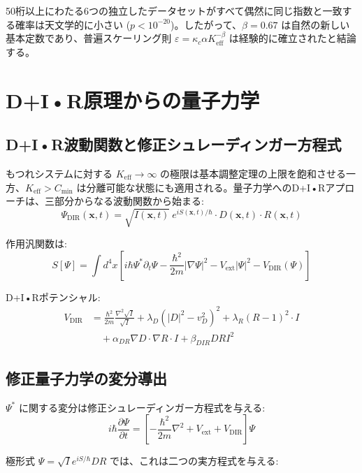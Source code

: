 \documentclass[11pt,a4paper]{article}
\begin{document}
	50桁以上にわたる6つの独立したデータセットがすべて偶然に同じ指数と一致する確率は天文学的に小さい ($p < 10^{-20}$)。したがって、$\beta = 0.67$ は自然の新しい基本定数であり、普遍スケーリング則 $\varepsilon = \kappa_c \alpha K_{\mathrm{eff}}^{-\beta}$ は経験的に確立されたと結論する。
	
	\section{D+I•R原理からの量子力学}
	\subsection{D+I•R波動関数と修正シュレーディンガー方程式}
	もつれシステムに対する $K_{\mathrm{eff}} \to \infty$ の極限は基本調整定理の上限を飽和させる一方、$K_{\mathrm{eff}} > C_{\min}$ は分離可能な状態にも適用される。量子力学へのD+I•Rアプローチは、三部分からなる波動関数から始まる:
	\begin{equation}
		\Psi_{\text{DIR}}(\mathbf{x},t) = \sqrt{I(\mathbf{x},t)} \ e^{iS(\mathbf{x},t)/\hbar} \cdot D(\mathbf{x},t) \cdot R(\mathbf{x},t)
	\end{equation}
	
	作用汎関数は:
	\begin{equation}
		S[\Psi] = \int d^4x \left[ i\hbar \Psi^* \partial_t \Psi - \frac{\hbar^2}{2m} |\nabla \Psi|^2 - V_{\text{ext}} |\Psi|^2 - V_{\text{DIR}}(\Psi) \right]
	\end{equation}
	
	D+I•Rポテンシャル:
	\begin{align}
		V_{\text{DIR}} &= \frac{\hbar^2}{2m} \frac{\nabla^2 \sqrt{I}}{\sqrt{I}} 
		+ \lambda_D (|D|^2 - v_D^2)^2 
		+ \lambda_R (R - 1)^2 \cdot I \\
		&\quad + \alpha_{DR} \nabla D \cdot \nabla R \cdot I 
		+ \beta_{DIR} D R I^2
	\end{align}
	
	\subsection{修正量子力学の変分導出}
	
	$\Psi^*$ に関する変分は修正シュレーディンガー方程式を与える:
	\begin{equation}
		i\hbar \frac{\partial \Psi}{\partial t} = \left[ -\frac{\hbar^2}{2m} \nabla^2 + V_{\text{ext}} + V_{\text{DIR}} \right] \Psi
	\end{equation}
	
	極形式 $\Psi = \sqrt{I} e^{iS/\hbar} D R$ では、これは二つの実方程式を与える:
	
\end{document}
